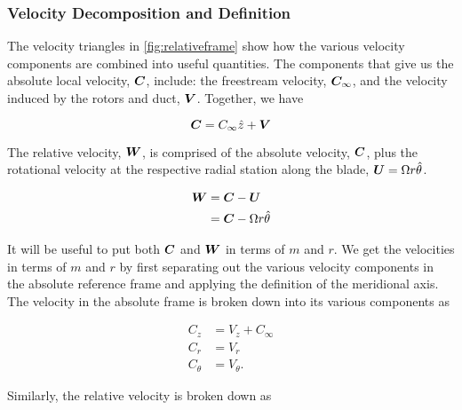 \subsubsection{Velocity Decomposition and Definition}

The velocity triangles in \cref{fig:relativeframe} show how the various velocity components are combined into useful quantities.
%
The components that give us the absolute local velocity, \(\bm{C}\), include: the freestream velocity, \(\bm{C}_\infty\),
and the velocity induced by the rotors and duct, \(\bm{V}\).
%
Together, we have

\begin{equation}
    \bm{C} = C_\infty \hat{z} + \bm{V}
\end{equation}

The relative velocity, \(\bm{W}\), is comprised of the absolute velocity, \(\bm{C}\), plus the rotational velocity at the respective radial station along the blade, \(\bm{U} = \Omega r \hat{\theta}\).

\begin{equation}
    \begin{aligned}
        \bm{W} &= \bm{C} - \bm{U}\\
                 &= \bm{C} - \Omega r \hat{\theta}
    \end{aligned}
\end{equation}

It will be useful to put both \(\bm{C}\) and \(\bm{W}\) in terms of \(m\) and \(r\).
%
We get the velocities in terms of \(m\) and \(r\) by first separating out the various velocity components in the absolute reference frame and applying the definition of the meridional axis.
%
The velocity in the absolute frame is broken down into its various components as

\begin{equation}
    \label{eqn:absolutevelocities}
    \begin{aligned}
        C_z &= V_z +  C_\infty \\
        C_r & = V_r  \\
        C_\theta &= V_\theta.
    \end{aligned}
\end{equation}

Similarly, the relative velocity is broken down as

